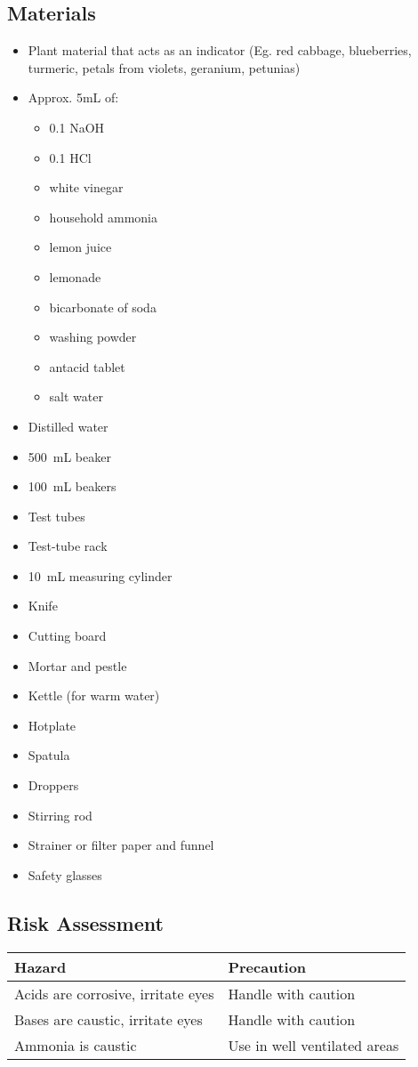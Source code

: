 	\subsection{Materials}
		\begin{itemize}
			\item Plant material that acts as an indicator (Eg. red cabbage, blueberries, turmeric, petals from violets, geranium, petunias)
			\item Approx. 5mL of:
			\begin{itemize}
				\item \qty{0.1}{\moLar} NaOH
				\item \qty{0.1}{\moLar} HCl
				\item white vinegar
				\item household ammonia
				\item lemon juice
				\item lemonade
				\item bicarbonate of soda
				\item washing powder
				\item antacid tablet
				\item salt water
			\end{itemize}
			\item Distilled water
			\item \qty{500}{mL} beaker
			\item \qty{100}{mL} beakers
			\item Test tubes
			\item Test-tube rack
			\item \qty{10}{mL} measuring cylinder
			\item Knife
			\item Cutting board
			\item Mortar and pestle
			\item Kettle (for warm water)
			\item Hotplate
			\item Spatula
			\item Droppers
			\item Stirring rod
			\item Strainer or filter paper and funnel
			\item Safety glasses
		\end{itemize}

	\subsection{Risk Assessment}
		\begin{table}[H]
			\centering
			\begin{tabular}{ll}
				\hline
				Hazard & Precaution \\ \hline
				Acids are corrosive, irritate eyes & Handle with caution \\
				Bases are caustic, irritate eyes & Handle with caution \\ \hline
				Ammonia is caustic & Use in well ventilated areas \\ \hline
			\end{tabular}
		\end{table}
	
